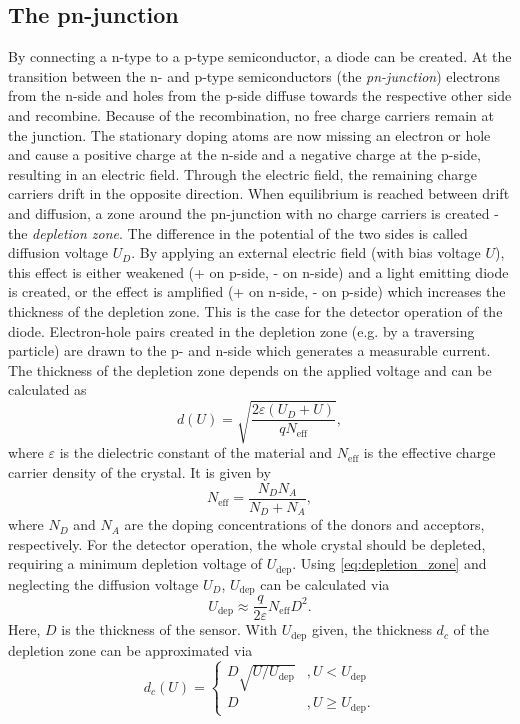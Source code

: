 \subsection{The pn-junction}
By connecting a n-type to a p-type semiconductor, a diode can be created. At the transition between the n- and p-type semiconductors (the \textit{pn-junction}) electrons from the 
n-side and holes from the p-side diffuse towards the respective other side and recombine. Because of the recombination, no free charge carriers remain at the junction.
The stationary doping atoms are now missing an electron or hole and cause a positive charge at the n-side and a negative charge at the p-side, resulting in an electric field.
Through the electric field, the remaining charge carriers drift in the opposite direction. When equilibrium is reached between drift and diffusion, a zone around the pn-junction 
with no charge carriers is created - the \textit{depletion zone}. The difference in the potential of the two sides is called diffusion voltage $U_D$.
By applying an external electric field (with bias voltage $U$), this effect is either weakened (+ on p-side, - on n-side) and a light emitting diode is created, or the effect is amplified 
(+ on n-side, - on p-side) which increases the thickness of the depletion zone. This is the case for the detector operation of the diode. Electron-hole pairs created in the
depletion zone (e.g. by a traversing particle) are drawn to the p- and n-side which generates a measurable current.
The thickness of the depletion zone depends on the applied voltage and can be calculated as 
\begin{equation}
    d(U) = \sqrt{\frac{2\varepsilon (U_D + U)}{qN_\text{eff}}},
    \label{eq:depletion_zone}
\end{equation}
where $\varepsilon$ is the dielectric constant of the material and $N_\text{eff}$ is the effective charge carrier density of the crystal.
It is given by 
\begin{equation}
    N_\text{eff} = \frac{N_D N_A}{N_D + N_A},
    \label{eq:N_eff}
\end{equation}
where $N_D$ and $N_A$ are the doping concentrations of the donors and acceptors, respectively.
For the detector operation, the whole crystal should be depleted, requiring a minimum depletion voltage of $U_\text{dep}$. Using \autoref{eq:depletion_zone} and neglecting 
the diffusion voltage $U_D$, $U_\text{dep}$ can be calculated via
\begin{equation}
    U_\text{dep} \approx \frac{q}{2\varepsilon} N_\text{eff} D^2.
    \label{eq:U_dep}
\end{equation}
Here, $D$ is the thickness of the sensor.
With $U_\text{dep}$ given, the thickness $d_c$ of the depletion zone can be approximated via 
\begin{equation}
    d_c(U) = 
    \begin{cases}
        D \sqrt{U/U_\text{dep}} & , U<U_\text{dep} \\
        D & , U \geq U_\text{dep}.
    \end{cases}
\end{equation}

